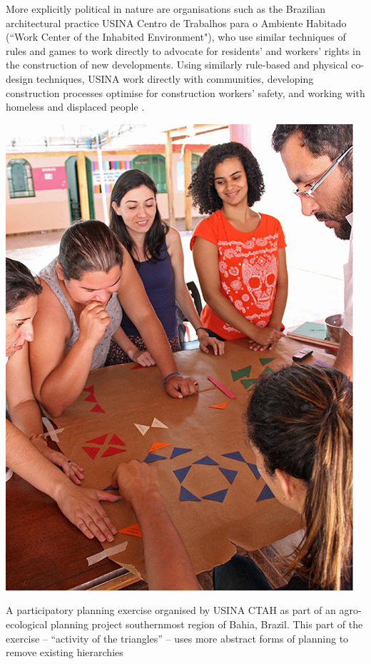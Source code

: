 \documentclass[nofonts,nols,justified,nobib]{tufte-book}
\begin{document}
More explicitly political in nature are organisations such as the Brazilian architectural practice USINA Centro de Trabalhos para o Ambiente Habitado (``Work Center of the Inhabited Environment"), who use similar techniques of rules and games to work directly to advocate for residents' and workers' rights in the construction of new developments. Using similarly rule-based and physical co-design techniques, USINA work directly with communities, developing construction processes optimise for construction workers' safety, and working with homeless and displaced people \cite{noauthor_usina_ctah_nodate}.

\begin{marginfigure}
\includegraphics[width=\textwidth]{img/1/usina-triangles.jpg}
\caption{A participatory planning exercise organised by USINA CTAH as part of an agro-ecological planning project southernmost region of Bahia, Brazil. This part of the exercise -- ``activity of the triangles'' -- uses more abstract forms of planning to remove existing hierarchies  \cite{noauthor_usina_ctah_nodate}}
\end{marginfigure}
\end{document}
